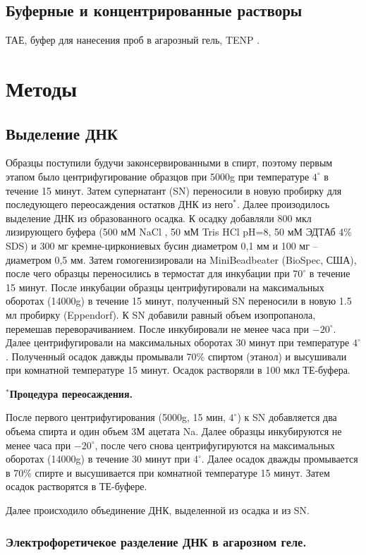 \subsection{Буферные и концентрированные растворы}
ТАЕ, буфер для нанесения проб в агарозный гель, TENP .

\section{Методы} \label{sect1_2}
\subsection{Выделение ДНК} \label{subsect1_2_1}
Образцы поступили будучи законсервированными в спирт, поэтому первым этапом было центрифугирование образцов при 5000g при температуре $4^{\circ}$ в течение 15 минут. Затем супернатант (SN) переносили в новую пробирку для последующего переосаждения остатков ДНК из него$^*$. Далее произодилось выделение ДНК из образованного осадка. К осадку добавляли 800 мкл лизирующего буфера (500 мМ NaCl , 50 мМ Tris HCl pH=8, 50 мМ ЭДТАб 4\% SDS) и 300 мг кремне-циркониевых бусин диаметром 0,1 мм и 100 мг – диаметром 0,5 мм. Затем гомогенизировали на MiniBeadbeater (BioSpec, США), после чего образцы переносились в термостат для инкубации при $70^{\circ}$ в течение 15 минут. После инкубации образцы центрифугировали на максимальных оборотах (14000g) в течение 15 минут, полученный SN переносили в новую 1.5 мл пробирку (Eppendorf). К SN добавили равный объем изопропанола, перемешав переворачиванием. После инкубировали не менее часа при $-20^{\circ}$. Далее центрифугировали на максимальных оборотах 30 минут при температуре $4^{\circ}$ . Полученный осадок давжды промывали 70\% спиртом (этанол) и высушивали при комнатной температуре 15 минут. Осадок растворяли в 100 мкл ТЕ-буфера. 

$^*$\textbf{Процедура переосаждения.}

После первого центрифугирования (5000g, 15 мин, $4^{\circ}$) к SN добавляется два объема спирта и один объем 3М ацетата Na. Далее образцы инкубируются не менее часа при $-20^{\circ}$, после чего снова центрифугируются на максимальных оборотах (14000g) в течение 30 минут при $4^{\circ}$. Далее осадок дважды промывается в 70\% спирте и высушивается при комнатной температуре 15 минут. Затем осадок растворятся в ТЕ-буфере. 

Далее происходило объединение ДНК, выделенной из осадка и из SN. 

\subsubsection{ Электрофоретичекое разделение ДНК в агарозном геле.} 

